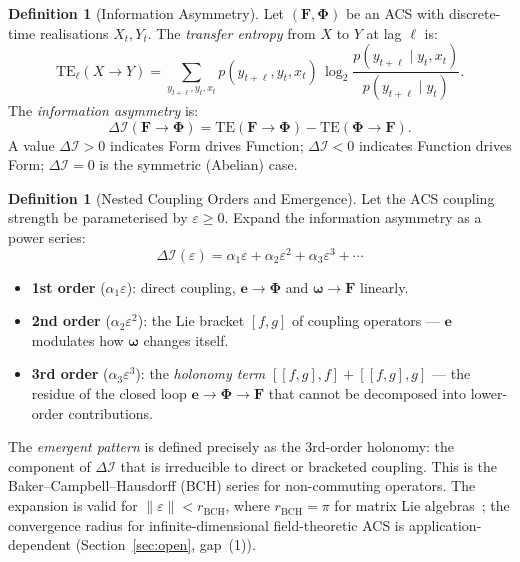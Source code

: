 \documentclass[12pt,a4paper]{article}
\theoremstyle{plain}
\theoremstyle{definition}
\newtheorem{definition}[theorem]{Definition}
\theoremstyle{remark}
\newcommand{\DI}{\Delta\mathcal{I}}
\newcommand{\eps}{\varepsilon}
\newcommand{\FormF}{\mathbf{F}}
\newcommand{\FuncF}{\boldsymbol{\Phi}}
\providecommand{\Form}{\mathbf{e}}
\providecommand{\Func}{\boldsymbol{\omega}}
\newcommand{\TE}{\mathrm{TE}}
\begin{document}
\begin{definition}[Information Asymmetry]\label{def:DI}
Let $(\FormF, \FuncF)$ be an ACS with discrete-time realisations $X_t, Y_t$.
The \emph{transfer entropy} from $X$ to $Y$ at lag $\ell$ is:
\begin{equation}
  \TE_\ell(X \to Y) = 
  \sum_{y_{t+\ell}, y_t, x_t} 
  p(y_{t+\ell}, y_t, x_t)\,
  \log_2 \frac{p(y_{t+\ell} \mid y_t, x_t)}{p(y_{t+\ell} \mid y_t)}.
\end{equation}
The \emph{information asymmetry} is:
\begin{equation}
  \DI(\FormF \to \FuncF) = \TE(\FormF \to \FuncF) - \TE(\FuncF \to \FormF).
\end{equation}
A value $\DI > 0$ indicates Form drives Function;
$\DI < 0$ indicates Function drives Form;
$\DI = 0$ is the symmetric (Abelian) case.
\end{definition}

\begin{definition}[Nested Coupling Orders and Emergence]\label{def:nested}
Let the ACS coupling strength be parameterised by $\eps \geq 0$.
Expand the information asymmetry as a power series:
\begin{equation}
  \DI(\eps) = \alpha_1 \eps + \alpha_2 \eps^2 + \alpha_3 \eps^3 + \cdots
\end{equation}
\begin{itemize}[noitemsep]
  \item \textbf{1st order} ($\alpha_1 \eps$): direct coupling, $\Form \to \FuncF$ and $\Func \to \FormF$ linearly.
  \item \textbf{2nd order} ($\alpha_2 \eps^2$): the Lie bracket $[f,g]$ of coupling 
    operators --- $\Form$ modulates how $\Func$ changes itself.
  \item \textbf{3rd order} ($\alpha_3 \eps^3$): the \emph{holonomy term} 
    $[[f,g],f] + [[f,g],g]$ --- the residue of the closed loop 
    $\Form \to \FuncF \to \FormF$ that cannot be decomposed into lower-order contributions.
\end{itemize}
The \emph{emergent pattern} is defined precisely as the 3rd-order holonomy: 
the component of $\DI$ that is irreducible to direct or bracketed coupling.
This is the Baker--Campbell--Hausdorff (BCH) series for non-commuting operators.
The expansion is valid for $\|\eps\| < r_{\mathrm{BCH}}$, where
$r_{\mathrm{BCH}} = \pi$ for matrix Lie algebras~\cite{Hall2015};
the convergence radius for infinite-dimensional field-theoretic ACS
is application-dependent (Section~\ref{sec:open}, gap~(1)).
\end{definition}
\end{document}
